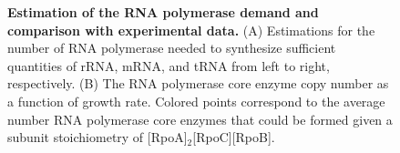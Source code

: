 \begin{figure}
        \caption{\textbf{Estimation of the RNA polymerase demand and
        comparison with experimental data.} (A) Estimations for the number of
        RNA polymerase needed to synthesize sufficient quantities of rRNA, mRNA,
        and tRNA from left to right, respectively. (B) The RNA
        polymerase core enzyme copy number as a function of growth rate. Colored
        points correspond to the average number RNA polymerase core enzymes that
        could be formed given a subunit stoichiometry of
        [RpoA]$_2$[RpoC][RpoB].} \label{fig:RNA_synthesis}

        \label{figsupp:sigma_70}

\end{figure}
